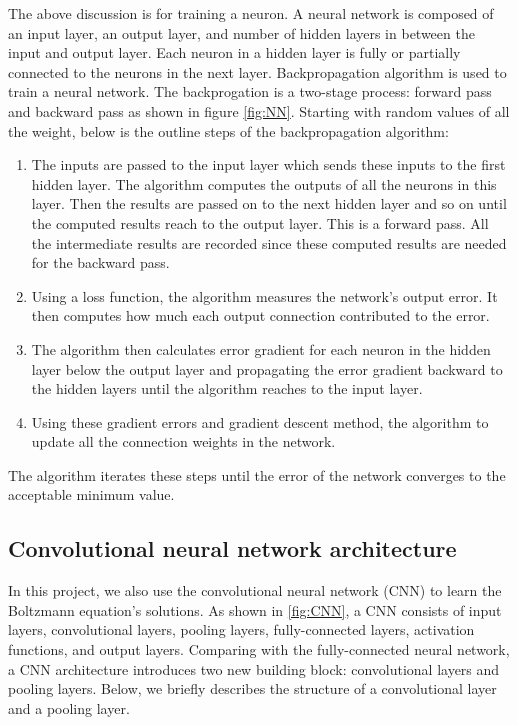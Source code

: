 \documentclass{article}
\begin{document}
The above discussion is for training a neuron. A neural network is composed of an input layer, an output layer, and number of hidden layers in between the input and output layer. Each neuron in a hidden layer is fully or partially connected to the neurons in the next layer. Backpropagation algorithm is used to train a neural network. The backprogation is a two-stage process: forward pass and backward pass as shown in figure \ref{fig:NN}. Starting with random values of all the weight, below is the outline steps of the backpropagation algorithm:
\begin{enumerate}
\item The inputs are passed to the input layer which sends these inputs to the first hidden layer. The algorithm computes the outputs of all the neurons in this layer. Then the results are passed on to the next hidden layer and so on until the computed results reach to the output layer. This is a forward pass. All the intermediate results are recorded since these computed results are needed for the backward pass.
\item Using a loss function, the algorithm measures the network's output error. It then computes how much each output connection contributed to the error.
\item The algorithm then calculates error gradient for each neuron in the hidden layer below the output layer and propagating the error gradient backward to the hidden layers until the algorithm reaches to the input layer.
\item Using these gradient errors and gradient descent method, the algorithm to update all the connection weights in the network. 
\end{enumerate}
The algorithm iterates these steps until the error of the network converges to the acceptable minimum value.

\subsection{Convolutional neural network architecture} \label{CNN}
In this project, we also use the convolutional neural network (CNN) to learn the Boltzmann equation's solutions. As shown in \ref{fig:CNN}, a CNN consists of input layers, convolutional layers, pooling layers, fully-connected layers, activation functions, and output layers. Comparing with the fully-connected neural network, a CNN architecture introduces two new building block: convolutional layers and pooling layers. Below, we briefly describes the structure of a convolutional layer and a pooling layer.
\end{document}
